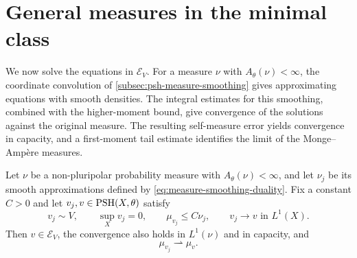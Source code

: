 \section{General measures in the minimal class}
\label{sec:big-measure-smoothing}

We now solve the equations in $\mathcal E_V$. For a measure $\nu$ with $A_\theta(\nu)<\infty$, the coordinate convolution of \cref{subsec:psh-measure-smoothing} gives approximating equations with smooth densities. The integral estimates for this smoothing, combined with the higher-moment bound, give convergence of the solutions against the original measure. The resulting self-measure error yields convergence in capacity, and a first-moment tail estimate identifies the limit of the Monge--Amp\`ere measures.

\begin{proposition}\label{prop:big-smoothed-measure-continuity}
Let $\nu$ be a non-pluripolar probability measure with $A_\theta(\nu)<\infty$, and let $\nu_j$ be its smooth approximations defined by \eqref{eq:measure-smoothing-duality}. Fix a constant $C>0$ and let $v_j,v\in\mathrm{PSH}(X,\theta)$ satisfy
\[
 v_j\sim V,\qquad \sup_Xv_j=0,\qquad
 \mu_{v_j}\leq C\nu_j,
 \qquad v_j\longrightarrow v\text{ in }L^1(X).
\]
Then $v\in\mathcal E_V$, the convergence also holds in $L^1(\nu)$ and in capacity, and
\[
 \mu_{v_j}\rightharpoonup\mu_v.
\]
\end{proposition}
